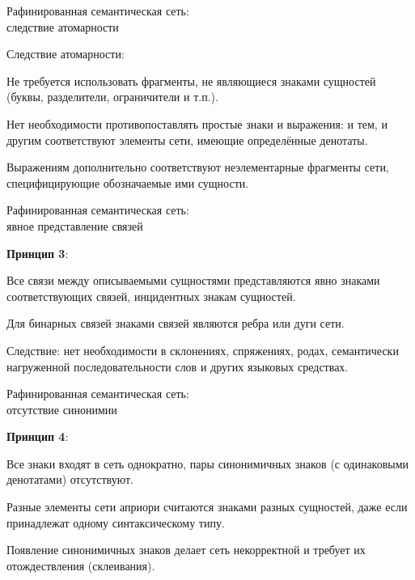 \begin{frame}{Рафинированная семантическая сеть:\\следствие атомарности}
	\topline
	\justifying
	
	Следствие атомарности:
	\begin{textitemize}
		\item Не требуется использовать фрагменты, не являющиеся знаками сущностей (буквы, разделители, ограничители и т.п.).
		\item Нет необходимости противопоставлять простые знаки и выражения: и тем, и другим соответствуют элементы сети, имеющие определённые денотаты.
		\item Выражениям дополнительно соответствуют неэлементарные фрагменты сети, специфицирующие обозначаемые ими сущности.
	\end{textitemize}
	
\end{frame}


\begin{frame}{Рафинированная семантическая сеть:\\явное представление связей}
	\topline
	\justifying
	
	\textbf{Принцип 3}:
	\begin{textitemize}
		\item Все связи между описываемыми сущностями представляются явно знаками соответствующих связей, инцидентных знакам сущностей.
		\item Для бинарных связей знаками связей являются ребра или дуги сети.
	\end{textitemize}
	
	\medskip
	Следствие: нет необходимости в склонениях, спряжениях, родах, семантически нагруженной последовательности слов и других языковых средствах.
	
\end{frame}


\begin{frame}{Рафинированная семантическая сеть:\\отсутствие синонимии}
	\topline
	\justifying
	
	\textbf{Принцип 4}:
	\begin{textitemize}
		\item Все знаки входят в сеть однократно, пары синонимичных знаков (с одинаковыми денотатами) отсутствуют.
		\item Разные элементы сети априори считаются знаками разных сущностей, даже если принадлежат одному синтаксическому типу.
	\end{textitemize}
	
	\medskip
	Появление синонимичных знаков делает сеть некорректной и требует их отождествления (склеивания).
	
\end{frame}


